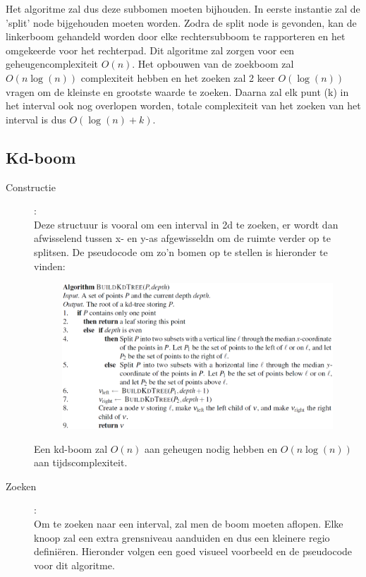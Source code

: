 \documentclass[12pt,a4paper]{article}
\begin{document}
	Het algoritme zal dus deze subbomen moeten bijhouden. In eerste instantie zal de 'split' node bijgehouden moeten worden. Zodra de split node is gevonden, kan de linkerboom gehandeld worden door elke rechtersubboom te rapporteren en het omgekeerde voor het rechterpad. Dit algoritme zal zorgen voor een geheugencomplexiteit $O(n)$. Het opbouwen van de zoekboom zal $O(n\log(n))$ complexiteit hebben en het zoeken zal 2 keer $O(\log(n))$ vragen om de kleinste en grootste waarde te zoeken. Daarna zal elk punt (k) in het interval ook nog overlopen worden, totale complexiteit van het zoeken van het interval is dus $O(\log(n) + k)$. 
	
	
	\subsection{Kd-boom}
	\begin{description}
		\item[Constructie]:\\
		Deze structuur is vooral om een interval in 2d te zoeken, er wordt dan afwisselend tussen x- en y-as afgewisseldn om de ruimte verder op te splitsen. De pseudocode om zo'n bomen op te stellen is hieronder te vinden: 
		\begin{figure}[H]
			\centering
			\includegraphics[width=0.7\linewidth]{afbeeldingen/kd-bomen/constructie}
			\label{fig:kd-constructie}
		\end{figure}
		Een kd-boom zal $O(n)$ aan geheugen nodig hebben en $O(n\log(n))$ aan tijdscomplexiteit. 
		\item[Zoeken]:\\
		Om te zoeken naar een interval, zal men de boom moeten aflopen. Elke knoop zal een extra grensniveau aanduiden en dus een kleinere regio definiëren. Hieronder volgen een goed visueel voorbeeld en de pseudocode voor dit algoritme. 
		\begin{figure}[h]
			\centering

\end{figure}
\end{description}
\end{document}
